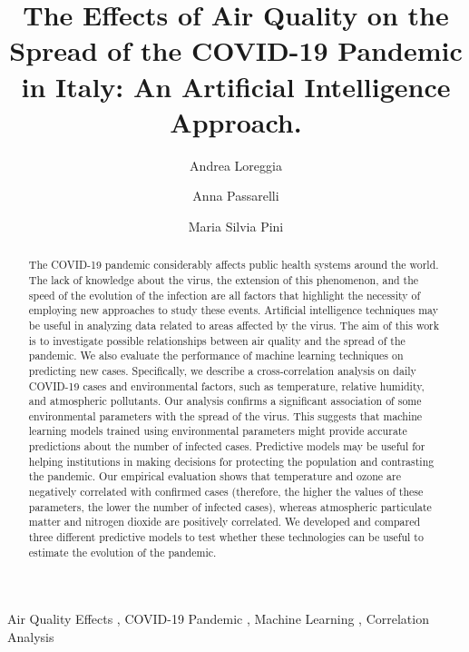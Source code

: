 \documentclass[review]{elsarticle}
\begin{document}
\begin{frontmatter}

\title{The Effects of Air Quality on the Spread of the COVID-19 Pandemic in Italy: An  Artificial Intelligence Approach.}

\author{Andrea Loreggia}
\address{European University Institute}

\author{Anna Passarelli}
\address{University of Padova}

\author{Maria Silvia Pini}
\address{University of Padova}

\begin{abstract}
The COVID-19 pandemic considerably affects public health systems around the world. The lack of knowledge about the virus, the extension of this phenomenon, and the speed of the evolution of the infection are all factors that highlight the necessity of employing new approaches to study these events. Artificial intelligence techniques may be useful in analyzing data related to areas affected by the virus.
%
The aim of this work is to investigate possible relationships between air quality and the spread of the pandemic. We also evaluate the performance of machine learning techniques on predicting new cases. Specifically, we describe a cross-correlation analysis on daily COVID-19 cases and environmental factors, such as temperature, relative humidity, and atmospheric pollutants. 
Our analysis confirms a significant association of some environmental parameters with the spread of the virus. This suggests that machine learning models trained using environmental parameters might provide accurate predictions about the number of infected cases. Predictive models may be useful for helping institutions in making decisions for protecting the population and contrasting the pandemic. Our empirical evaluation shows that temperature and ozone are negatively correlated with confirmed cases (therefore, the higher the values of these parameters, the lower the number of infected cases), whereas atmospheric particulate matter and nitrogen dioxide are positively correlated. We developed and compared three different predictive models to test whether these technologies can be useful to estimate the evolution of the pandemic.  
\end{abstract}

\begin{keyword}
Air Quality Effects \sep
COVID-19 Pandemic \sep
Machine Learning \sep
Correlation Analysis
\end{keyword}

\end{frontmatter}
\end{document}
